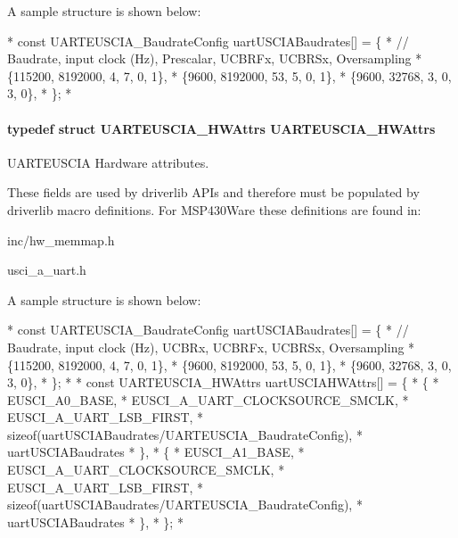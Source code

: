 A sample structure is shown below\-: 
\begin{DoxyCode}
*  \textcolor{keyword}{const} UARTEUSCIA_BaudrateConfig uartUSCIABaudrates[] = \{
*   \textcolor{comment}{// Baudrate, input clock (Hz), Prescalar, UCBRFx, UCBRSx, Oversampling}
*      \{115200,  8192000,          4,         7,      0,      1\},
*      \{9600,    8192000,          53,        5,      0,      1\},
*      \{9600,    32768,            3,         0,      3,      0\},
*  \};
*  
\end{DoxyCode}
\paragraph[{U\-A\-R\-T\-E\-U\-S\-C\-I\-A\-\_\-\-H\-W\-Attrs}]{\setlength{\rightskip}{0pt plus 5cm}typedef struct {\bf U\-A\-R\-T\-E\-U\-S\-C\-I\-A\-\_\-\-H\-W\-Attrs}  {\bf U\-A\-R\-T\-E\-U\-S\-C\-I\-A\-\_\-\-H\-W\-Attrs}}\label{_u_a_r_t_e_u_s_c_i_a_8h_ac2776f64ec5846ca87b5ddcd052b551e}


U\-A\-R\-T\-E\-U\-S\-C\-I\-A Hardware attributes. 

These fields are used by driverlib A\-P\-Is and therefore must be populated by driverlib macro definitions. For M\-S\-P430\-Ware these definitions are found in\-:
\begin{DoxyItemize}
\item inc/hw\-\_\-memmap.\-h
\item usci\-\_\-a\-\_\-uart.\-h
\end{DoxyItemize}

A sample structure is shown below\-: 
\begin{DoxyCode}
*  \textcolor{keyword}{const} UARTEUSCIA_BaudrateConfig uartUSCIABaudrates[] = \{
*   \textcolor{comment}{// Baudrate, input clock (Hz), UCBRx, UCBRFx, UCBRSx, Oversampling}
*      \{115200,  8192000,          4,     7,      0,      1\},
*      \{9600,    8192000,          53,    5,      0,      1\},
*      \{9600,    32768,            3,     0,      3,      0\},
*  \};
*
*  \textcolor{keyword}{const} UARTEUSCIA_HWAttrs uartUSCIAHWAttrs[] = \{
*      \{
*          EUSCI\_A0\_BASE,
*          EUSCI\_A\_UART\_CLOCKSOURCE\_SMCLK,
*          EUSCI\_A\_UART\_LSB\_FIRST,
*          \textcolor{keyword}{sizeof}(uartUSCIABaudrates/UARTEUSCIA_BaudrateConfig),
*          uartUSCIABaudrates
*      \},
*      \{
*          EUSCI\_A1\_BASE,
*          EUSCI\_A\_UART\_CLOCKSOURCE\_SMCLK,
*          EUSCI\_A\_UART\_LSB\_FIRST,
*          \textcolor{keyword}{sizeof}(uartUSCIABaudrates/UARTEUSCIA_BaudrateConfig),
*          uartUSCIABaudrates
*      \},
*  \};
*  
\end{DoxyCode}
